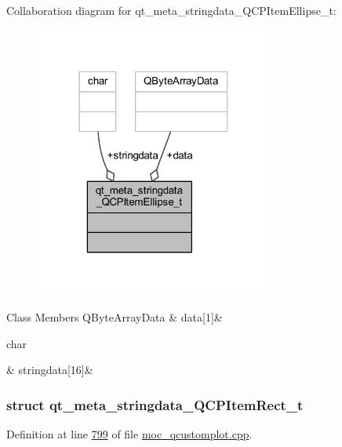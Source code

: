 Collaboration diagram for qt\+\_\+meta\+\_\+stringdata\+\_\+\+Q\+C\+P\+Item\+Ellipse\+\_\+t\+:
\nopagebreak
\begin{figure}[H]
\begin{center}
\leavevmode
\includegraphics[width=222pt]{de/d45/a00175}
\end{center}
\end{figure}
\begin{DoxyFields}{Class Members}
\hypertarget{a00016_a7efd0687e2b0fbd2c4df25855b74af30}{Q\+Byte\+Array\+Data}\label{a00016_a7efd0687e2b0fbd2c4df25855b74af30}
&
data\mbox{[}1\mbox{]}&
\\
\hline

\hypertarget{a00016_a35ee014e43cf9f75fa027534df3b222d}{char}\label{a00016_a35ee014e43cf9f75fa027534df3b222d}
&
stringdata\mbox{[}16\mbox{]}&
\\
\hline

\end{DoxyFields}
\label{d4/d81/a00110}
\hypertarget{a00016_d4/d81/a00110}{}
\subsubsection{struct qt\+\_\+meta\+\_\+stringdata\+\_\+\+Q\+C\+P\+Item\+Rect\+\_\+t}


Definition at line \hyperlink{a00016_source_l00799}{799} of file \hyperlink{a00016_source}{moc\+\_\+qcustomplot.\+cpp}.



